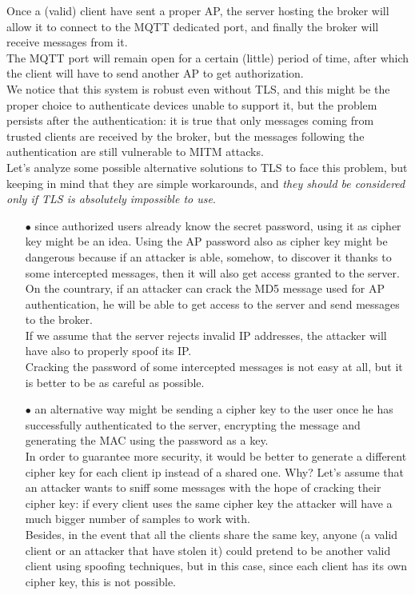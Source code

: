 \documentclass[12pt]{report}
\begin{document}
{{Once a (valid) client have sent a proper AP, the server hosting the broker will allow it to connect to the MQTT dedicated port, and finally the broker will receive messages from it.\\
The MQTT port will remain open for a certain (little) period of time, after which the client will have to send another AP to get authorization.\\

We notice that this system is robust even without TLS, and this might be the proper choice to authenticate devices unable to support it, but the problem persists after the authentication: it is true that only messages coming from trusted clients are received by the broker, but the messages following the authentication are still vulnerable to MITM attacks.\\

Let's analyze some possible alternative solutions to TLS to face this problem, but keeping in mind that they are simple workarounds, and \emph{they should be considered only if TLS is absolutely impossible to use}.

\begin{itemize}
\setlength{\itemindent}{+4mm}
\item[$\bullet$] since authorized users already know the secret password, using it as cipher key might be an idea. Using the AP password also as cipher key might be dangerous because if an attacker is able, somehow, to discover it thanks to some intercepted messages, then it will also get access granted to the server.\\
On the countrary, if an attacker can crack the MD5 message used for AP authentication, he will be able to get access to the server and send messages to the broker.\\
If we assume that the server rejects invalid IP addresses, the attacker will have also to properly spoof its IP.\\
Cracking the password of some intercepted messages is not easy at all, but it is better to be as careful as possible.
\item[$\bullet$] an alternative way might be sending a cipher key to the user once he has successfully authenticated to the server, encrypting the message and generating the MAC using the password as a key. \\
In order to guarantee more security, it would be better to generate a different cipher key for each client ip instead of a shared one. Why?
Let's assume that an attacker wants to sniff some messages with the hope of cracking their cipher key: if every client uses the same cipher key the attacker will have a much bigger number of samples to work with.\\
Besides, in the event that all the clients share the same key, anyone (a valid client or an attacker that have stolen it) could pretend to be another valid client using spoofing techniques, but in this case, since each client has its own cipher key, this is not possible.\\



\end{itemize}}}
\end{document}
